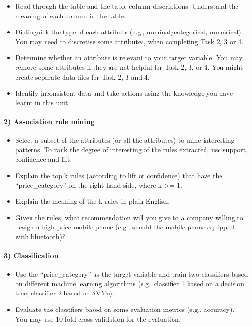 \documentclass[11pt]{article}
\providecommand{\tightlist}{%
      \setlength{\itemsep}{0pt}\setlength{\parskip}{0pt}}
\begin{document}
\begin{itemize}
\tightlist
\item
  Read through the table and the table column descriptions. Understand
  the meaning of each column in the table.
\item
  Distinguish the type of each attribute (e.g., nominal/categorical,
  numerical). You may need to discretise some attributes, when
  completing Task 2, 3 or 4.
\item
  Determine whether an attribute is relevant to your target variable.
  You may remove some attributes if they are not helpful for Task 2, 3,
  or 4. You might create separate data files for Task 2, 3 and 4.
\item
  Identify inconsistent data and take actions using the knowledge you
  have learnt in this unit.
\end{itemize}

\hypertarget{association-rule-mining}{%
\paragraph{2) Association rule mining}\label{association-rule-mining}}

\begin{itemize}
\tightlist
\item
  Select a subset of the attributes (or all the attributes) to mine
  interesting patterns. To rank the degree of interesting of the rules
  extracted, use support, confidence and lift.
\item
  Explain the top k rules (according to lift or confidence) that have
  the ``price\_category'' on the right-hand-side, where k \textgreater=
  1.
\item
  Explain the meaning of the k rules in plain English.
\item
  Given the rules, what recommendation will you give to a company
  willing to design a high price mobile phone (e.g., should the mobile
  phone equipped with bluetooth)?
\end{itemize}

\hypertarget{classification}{%
\paragraph{3) Classification}\label{classification}}

\begin{itemize}
\tightlist
\item
  Use the ``price\_category'' as the target variable and train two
  classifiers based on different machine learning algorithms
  (e.g.~classifier 1 based on a decision tree; classifier 2 based on
  SVMs).
\item
  Evaluate the classifiers based on some evaluation metrics (e.g.,
  accuracy). You may use 10-fold cross-validation for the evaluation.
\end{itemize}
\end{document}
